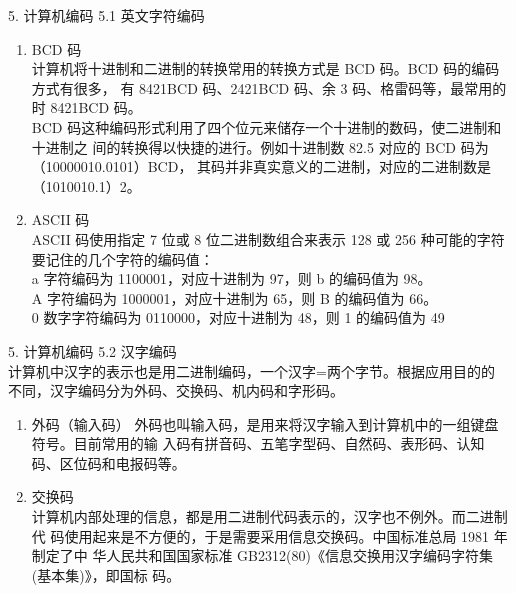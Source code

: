 \documentclass[aspectratio=169]{beamer}
\begin{document}
\begin{frame}[t]{5. 计算机编码} \vspace{20pt}
    5.1 英文字符编码

    \begin{enumerate}
        \item{BCD 码} \\
            计算机将十进制和二进制的转换常用的转换方式是 BCD 码。BCD 码的编码方式有很多，
            有 8421BCD 码、2421BCD 码、余 3 码、格雷码等，最常用的时 8421BCD 码。\\
            BCD 码这种编码形式利用了四个位元来储存一个十进制的数码，使二进制和十进制之
            间的转换得以快捷的进行。例如十进制数 82.5 对应的 BCD 码为（10000010.0101）BCD，
            其码并非真实意义的二进制，对应的二进制数是（1010010.1）2。\\



        \item{ASCII 码} \\
            ASCII 码使用指定 7 位或 8 位二进制数组合来表示 128 或 256 种可能的字符\\
            要记住的几个字符的编码值：\\
            a 字符编码为 1100001，对应十进制为 97，则 b 的编码值为 98。\\
            A 字符编码为 1000001，对应十进制为 65，则 B 的编码值为 66。\\
            0 数字字符编码为 0110000，对应十进制为 48，则 1 的编码值为 49\\
    \end{enumerate}

\end{frame}


\begin{frame}[t]{5. 计算机编码} \vspace{20pt}
    5.2 汉字编码\\
    计算机中汉字的表示也是用二进制编码，一个汉字=两个字节。根据应用目的的
不同，汉字编码分为外码、交换码、机内码和字形码。\\
    \begin{enumerate}
        \item{外码（输入码）} 外码也叫输入码，是用来将汉字输入到计算机中的一组键盘符号。目前常用的输
入码有拼音码、五笔字型码、自然码、表形码、认知码、区位码和电报码等。
        \item{交换码}\\
            计算机内部处理的信息，都是用二进制代码表示的，汉字也不例外。而二进制代
码使用起来是不方便的，于是需要采用信息交换码。中国标准总局 1981 年制定了中
            华人民共和国国家标准 GB2312(80)《信息交换用汉字编码字符集(基本集)》，即国标
码。\\

    \end{enumerate}
\end{frame}
\end{document}
